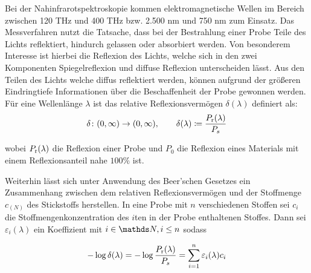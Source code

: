 		Bei der Nahinfrarotspektroskopie kommen elektromagnetische Wellen im Bereich zwischen 120 THz und 400 THz bzw. 2.500 nm und 750 nm zum Einsatz. \cite{Agelet2010}
		Das Messverfahren nutzt die Tatsache, dass bei der Bestrahlung einer Probe Teile des Lichts reflektiert, hindurch gelassen oder absorbiert werden.
		Von besonderem Interesse ist hierbei die Reflexion des Lichts, welche sich in den zwei Komponenten Spiegelreflexion und diffuse Reflexion unterscheiden lässt.
		Aus den Teilen des Lichts welche diffus reflektiert werden, können aufgrund der größeren Eindringtiefe Informationen über die Beschaffenheit der Probe gewonnen werden. \cite{Agelet2010}
		Für eine Wellenlänge $\lambda$ ist das relative Reflexionsvermögen $\delta(\lambda)$ definiert als:
		\[
			\delta\colon(0,\infty)\to(0,\infty),\qquad \delta(\lambda) \coloneqq \frac{P_{\mathrm{r}}(\lambda)}{P_s}
		\]
		
		wobei $P_{\mathrm{r}}(\lambda)$ die Reflexion einer Probe und $P_0$ die Reflexion eines Materials mit einem Reflexionsanteil nahe $100\%$ ist. 
		
		Weiterhin lässt sich unter Anwendung des Beer'schen Gesetzes ein Zusammenhang zwischen dem relativen Reflexionsvermögen und der Stoffmenge $c_{(N)}$ des Stickstoffs herstellen.
		In eine Probe mit $n$ verschiedenen Stoffen sei $c_i$ die Stoffmengenkonzentration des $i$ten in der Probe enthaltenen Stoffes. 
		Dann sei $\varepsilon_i(\lambda)$ ein Koeffizient mit $i\in\SN,i\leq n$ sodass
		
		\[
			-\log \delta(\lambda) = -\log \frac{P_{\mathrm{r}}(\lambda)}{P_s} = \sum_{i=1}^{n} \varepsilon_i(\lambda) c_i
		\]



